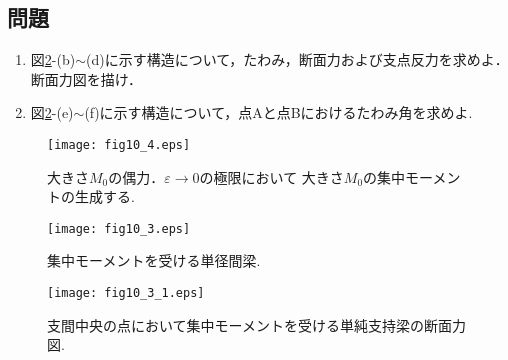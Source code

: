 \documentclass[10pt,a4j]{jarticle}
\begin{document}
\subsection{問題}
\begin{enumerate}
\item
図\ref{fig:fig10_3}-(b)$\sim$(d)に示す構造について，たわみ，断面力および支点反力を求めよ．
断面力図を描け．
\item
図\ref{fig:fig10_3}-(e)$\sim$(f)に示す構造について，点Aと点Bにおけるたわみ角を求めよ.
\end{enumerate}
\begin{figure}[h]
	\begin{center}
	\texttt{[image: fig10\_4.eps]} 
	\end{center}
	\caption{
		大きさ$M_0$の偶力．$\varepsilon\rightarrow 0$の極限において
		大きさ$M_0$の集中モーメントの生成する.
	} 
	\label{fig:fig10_4}
\end{figure}
\begin{figure}[h]
	\begin{center}
	\texttt{[image: fig10\_3.eps]} 
	\end{center}
	\caption{
		集中モーメントを受ける単径間梁.
	} 
	\label{fig:fig10_3}
\end{figure}
\begin{figure}[h]
	\begin{center}
	\texttt{[image: fig10\_3\_1.eps]} 
	\end{center}
	\caption{
		支間中央の点において集中モーメントを受ける単純支持梁の断面力図.
	} 
	\label{fig:fig10_3_1}
\end{figure}
\end{document}
